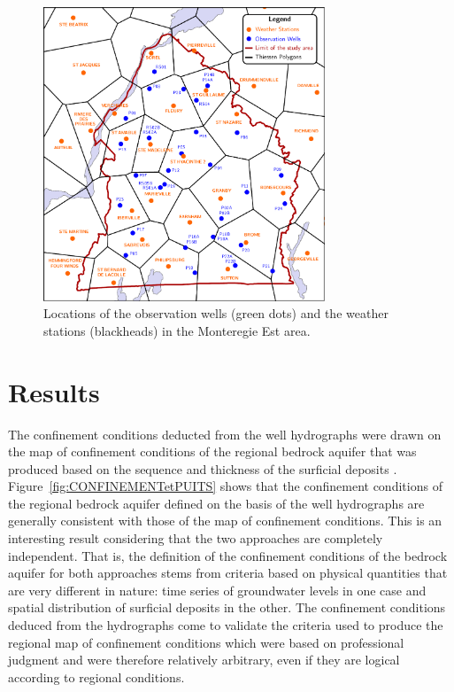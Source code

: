 \documentclass[WHATMANUAL.tex]{subfiles}
\begin{document}
\begin{figure}[!ht]
\centering
\includegraphics[width=0.75\textwidth]{img/Thiessen_meteo_wells}
\caption[Locations of the observation wells and the weather stations in the Monteregie Est area.]{Locations of the observation wells (green dots) and the weather stations (blackheads) in the Monteregie Est area.}
\label{fig:Thiessen_meteo_wells}
\end{figure}

\section{Results}

The confinement conditions deducted from the well hydrographs were drawn on the map of confinement conditions of the regional bedrock aquifer that was produced based on the sequence and thickness of the surficial deposits \citep{carrier_portrait_2013}. Figure~\ref{fig:CONFINEMENTetPUITS} shows that the confinement conditions of the regional bedrock aquifer defined on the basis of the well hydrographs are generally consistent with those of the map of confinement conditions. This is an interesting result considering that the two approaches are completely independent. That is, the definition of the confinement conditions of the bedrock aquifer for both approaches stems from criteria based on physical quantities that are very different in nature: time series of groundwater levels in one case and spatial distribution of surficial deposits in the other. The confinement conditions deduced from the hydrographs come to validate the criteria used to produce the regional map of confinement conditions which were based on professional judgment and were therefore relatively arbitrary, even if they are logical according to regional conditions.
\end{document}
